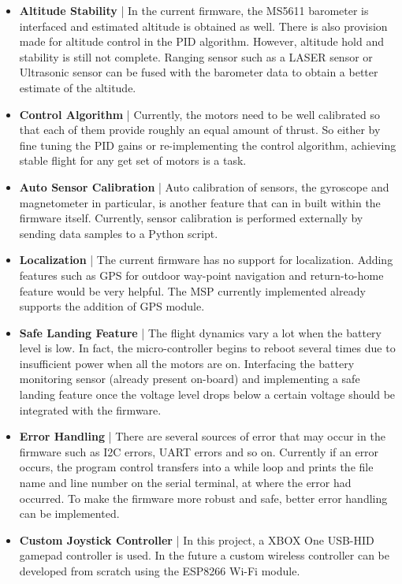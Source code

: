 \documentclass[a4paper,12pt,oneside]{book}
\begin{document}
\begin{itemize}
\item \textbf{Altitude Stability} | In the current firmware, the MS5611 barometer is interfaced and estimated altitude is obtained as well. There is also provision made for altitude control in the PID algorithm. However, altitude hold and stability is still not complete. Ranging sensor such as a LASER sensor or Ultrasonic sensor can be fused with the barometer data to obtain a better estimate of the altitude.\\

\item \textbf{Control Algorithm} | Currently, the motors need to be well calibrated so that each of them provide roughly an equal amount of thrust. So either by fine  tuning the PID gains or re-implementing the control algorithm, achieving stable flight for any get set of motors is a task.\\

\item \textbf{Auto Sensor Calibration} | Auto calibration of sensors, the gyroscope and magnetometer in particular, is another feature that can in built within the firmware itself. Currently, sensor calibration is performed externally by sending data samples to a Python script.

\item \textbf{Localization} | The current firmware has no support for localization. Adding features such as GPS for outdoor way-point navigation and return-to-home feature would be very helpful. The MSP currently implemented already supports the addition of GPS module.\\

\item \textbf{Safe Landing Feature} | The flight dynamics vary a lot when the battery level is low. In fact, the micro-controller begins to reboot several times due to insufficient power when all the motors are on. Interfacing the battery monitoring sensor (already present on-board) and implementing a safe landing feature once the voltage level drops below a certain voltage should be integrated with the firmware.\\

\item \textbf{Error Handling} | There are several sources of error that may occur in the firmware such as I2C errors, UART errors and so on. Currently if an error occurs, the program control transfers into a while loop and prints the file name and line number on the serial terminal, at where the error had occurred. To make the firmware more robust and safe, better error handling can be implemented.\\  

\item \textbf{Custom Joystick Controller} | In this project, a XBOX One USB-HID gamepad controller is used. In the future a custom wireless controller can be developed from scratch using the ESP8266 Wi-Fi module.

\end{itemize}
\end{document}

